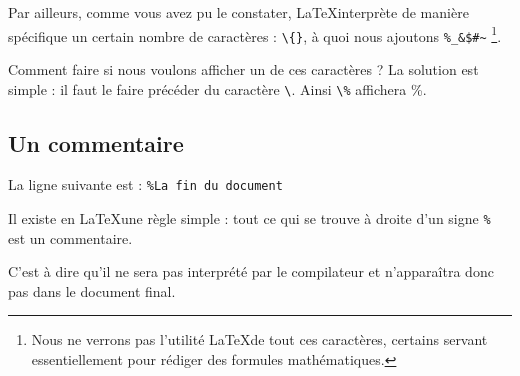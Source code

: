 








Par ailleurs, comme vous avez pu le constater, \LaTeX interprète de manière spécifique un certain nombre de caractères : \verb|\{}|, à quoi nous ajoutons \verb|%_&$#~| \footnote{Nous ne verrons pas l'utilité \LaTeX  de tout ces caractères, certains servant essentiellement pour rédiger des formules mathématiques.}.

Comment faire si nous voulons afficher un de ces caractères ? La solution est simple : il faut le faire précéder du caractère \verb|\|. Ainsi \verb|\%| affichera \%.   




\subsection{Un commentaire}

La ligne suivante est : \verb|%La fin du document|

Il existe en \LaTeX une règle simple : tout ce qui se trouve à droite d'un signe \verb|%| est un commentaire.

C'est à dire qu'il ne sera pas interprété par le compilateur et n'apparaîtra donc pas dans le document final. 

